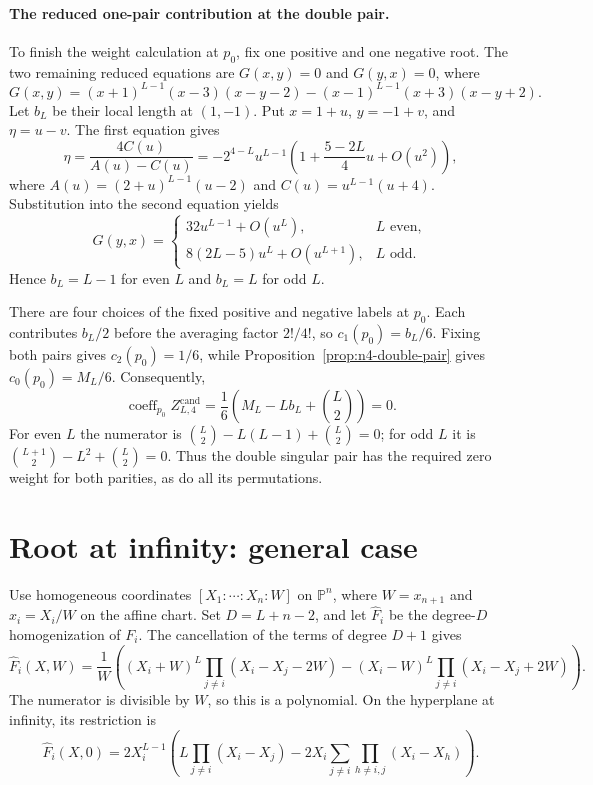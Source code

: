 \documentclass[11pt]{article}
\theoremstyle{definition}
\begin{document}
\paragraph{The reduced one-pair contribution at the double pair.}
To finish the weight calculation at $p_0$, fix one positive and one
negative root. The two remaining reduced equations are $G(x,y)=0$ and
$G(y,x)=0$, where
\[
 G(x,y)=(x+1)^{L-1}(x-3)(x-y-2)
       -(x-1)^{L-1}(x+3)(x-y+2).
\]
Let $b_L$ be their local length at $(1,-1)$. Put $x=1+u$, $y=-1+v$,
and $\eta=u-v$. The first equation gives
\[
 \eta=\frac{4C(u)}{A(u)-C(u)}
 =-2^{4-L}u^{L-1}
   \left(1+\frac{5-2L}{4}u+O(u^2)\right),
\]
where $A(u)=(2+u)^{L-1}(u-2)$ and $C(u)=u^{L-1}(u+4)$.
Substitution into the second equation yields
\[
 G(y,x)=
 \begin{cases}
 32u^{L-1}+O(u^L),&L\text{ even},\\
 8(2L-5)u^L+O(u^{L+1}),&L\text{ odd}.
 \end{cases}
\]
Hence $b_L=L-1$ for even $L$ and $b_L=L$ for odd $L$.

There are four choices of the fixed positive and negative labels at
$p_0$. Each contributes $b_L/2$ before the averaging factor $2!/4!$,
so $c_1(p_0)=b_L/6$. Fixing both pairs gives $c_2(p_0)=1/6$, while
Proposition~\ref{prop:n4-double-pair} gives $c_0(p_0)=M_L/6$.
Consequently,
\[
 \boxed{
 \operatorname{coeff}_{p_0}Z^{\mathrm{cand}}_{L,4}
 =\frac16\left(M_L-Lb_L+\binom L2\right)=0.}
\]
For even $L$ the numerator is
$\binom L2-L(L-1)+\binom L2=0$; for odd $L$ it is
$\binom{L+1}2-L^2+\binom L2=0$.
Thus the double singular pair has the required zero weight for both
parities, as do all its permutations.

\section{Root at infinity: general case}
\label{sec:general-infinity}

Use homogeneous coordinates $[X_1:\cdots:X_n:W]$ on $\mathbb P^n$,
where $W=x_{n+1}$ and $x_i=X_i/W$ on the affine chart. Set
$D=L+n-2$, and let $\widehat F_i$ be the degree-$D$ homogenization
of $F_i$. The cancellation of the terms of degree $D+1$ gives
\[
 \widehat F_i(X,W)=\frac1W\left(
 (X_i+W)^L\prod_{j\ne i}(X_i-X_j-2W)
 -(X_i-W)^L\prod_{j\ne i}(X_i-X_j+2W)\right).
\]
The numerator is divisible by $W$, so this is a polynomial. On the
hyperplane at infinity, its restriction is
\begin{equation}\label{eq:leading-equations-infinity}
 \widehat F_i(X,0)=2X_i^{L-1}\left(
 L\prod_{j\ne i}(X_i-X_j)
 -2X_i\sum_{j\ne i}\prod_{h\ne i,j}(X_i-X_h)
 \right).
\end{equation}
\end{document}
